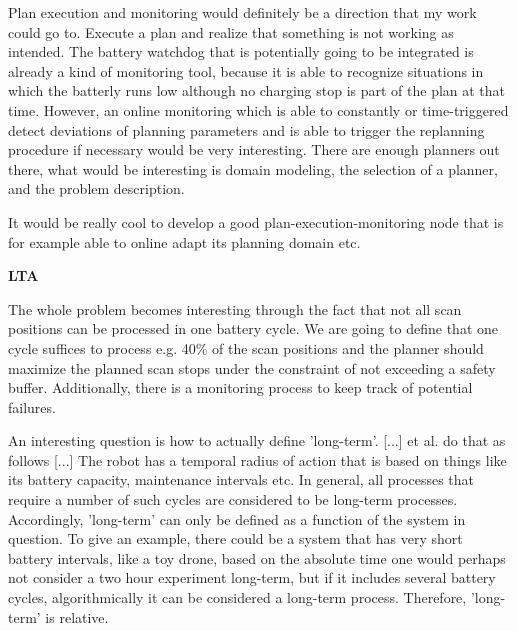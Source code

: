 \documentclass[german, master, expose, latin1]{base/thesis_KBS}
\begin{document}
Plan execution and monitoring would definitely be a direction that my work could go to.
Execute a plan and realize that something is not working as intended. The battery watchdog that is potentially going to be integrated is already a kind of monitoring
tool, because it is able to recognize situations in which the batterly runs low although no charging stop is part of the plan at that time.
However, an online monitoring which is able to constantly or time-triggered detect deviations of planning parameters and is able to trigger the replanning procedure
if necessary would be very interesting.\newline
There are enough planners out there, what would be interesting is domain modeling, the selection of a planner, and the problem description.\newline

It would be really cool to develop a good plan-execution-monitoring node that is for example able to online adapt its planning domain etc.\newline

\textbf{LTA}\newline

The whole problem becomes interesting through the fact that not all scan positions can be processed in one battery cycle.
We are going to define that one cycle suffices to process e.g. 40\% of the scan positions and the planner should maximize the planned scan stops under the
constraint of not exceeding a safety buffer. Additionally, there is a monitoring process to keep track of potential failures.\newline

An interesting question is how to actually define 'long-term'. [...] et al. do that as follows [...] The robot has a temporal radius of action that is based
on things like its battery capacity, maintenance intervals etc. In general, all processes that require a number of such cycles are considered to be long-term processes.
Accordingly, 'long-term' can only be defined as a function of the system in question. To give an example, there could be a system that has very short battery intervals,
like a toy drone, based on the absolute time one would perhaps not consider a two hour experiment long-term, but if it includes several battery cycles, algorithmically
it can be considered a long-term process. Therefore, 'long-term' is relative.\newline
\end{document}
